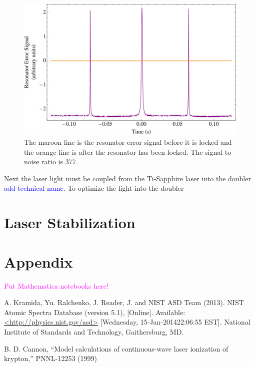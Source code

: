 \documentclass[prb,preprint]{revtex4-1}
\begin{document}
\begin{figure}[h!]
\centering
\includegraphics[width=6in]{ResonatorError.pdf}
\caption{The maroon line is the resonator error signal before it is locked and the orange line is after the resonator has been locked. The signal to noise ratio is 377.}
\label{ResonatorError}
\end{figure}

Next the laser light must be coupled from the Ti-Sapphire laser into the doubler \textcolor{blue}{add technical name}. To optimize the light into the doubler 


\section{Laser Stabilization}

\section{Appendix}

\textcolor{magenta}{Put Mathematica notebooks here!}


\begin{thebibliography}{2}

 A. Kramida, Yu. Ralchenko, J. Reader, J. and NIST ASD Team (2013). NIST Atomic Spectra Database (version 5.1), [Online]. Available: \url{<http://physics.nist.gov/asd>} [Wednesday, 15-Jan-201422:06:55 EST]. National Institute of Standards and Technology, Gaithersburg, MD.

 B. D. Cannon, ``Model calculations of continuous-wave laser ionization of krypton,'' PNNL-12253 (1999)

\end{thebibliography}
\end{document}
